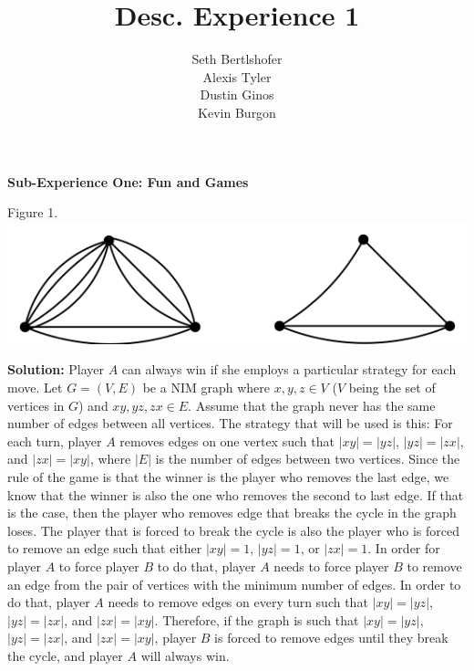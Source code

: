 \documentclass[10pt,a4paper]{report}
\author{Seth Bertlshofer\\Alexis Tyler\\Dustin Ginos\\Kevin Burgon}
\title{Desc. Experience 1}
\begin{document}
	\maketitle
	\textbf{Sub-Experience One: Fun and Games}\\
		\begin{center}
			Figure 1.\\
			\includegraphics[scale=.5]{e1.png}
			\newline
			\newline
		\end{center}
		
	\textbf{Solution: }Player $A$ can always win if she employs a particular strategy for each move.  Let $G = (V, E)$ be a NIM graph where $x, y, z \in V$ ($V$ being the set of vertices in $G$) and $xy, yz, zx \in E$.  Assume that the graph never has the same number of edges between all vertices. The strategy that will be used is this: For each turn, player $A$ removes edges on one vertex such that $|xy| = |yz|$, $|yz| = |zx|$, and $|zx| = |xy|$, where $|E|$ is the number of edges between two vertices. Since the rule of the game is that the winner is the player who removes the last edge, we know that the winner is also the one who removes the second to last edge.  If that is the case, then the player who removes edge that breaks the cycle in the graph loses. The player that is forced to break the cycle is also the player who is forced to remove an edge such that either $|xy| = 1$, $|yz| = 1$, or $|zx| = 1$.  In order for player $A$ to force player $B$ to do that, player $A$ needs to force player $B$ to remove an edge from the pair of vertices with the minimum number of edges.  In order to do that, player $A$ needs to remove edges on every turn such that $|xy| = |yz|$, $|yz| = |zx|$, and $|zx| = |xy|$. Therefore, if the graph is such that $|xy| = |yz|$, $|yz| = |zx|$, and $|zx| = |xy|$, player $B$ is forced to remove edges until they break the cycle, and player $A$ will always win.\\
	
\end{document}
